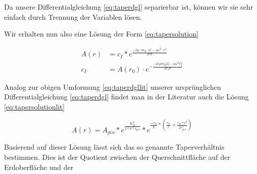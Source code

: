 \documentclass[a4paper, 10pt]{report}
\begin{document}

Da unsere Differentialgleichung \ref{eq:taperdgl} separierbar ist, können wir sie sehr einfach durch Trennung der Variablen lösen.


Wir erhalten nun also eine Lösung der Form \ref{eq:tapersolution}

\begin{align}
A(r) &= c_I * e^{\frac{-2\rho \cdot m_E \cdot G - \rho \omega^2 \cdot r^3}{2 r \sigma}}\label{eq:tapersolution}\\
c_I &= A(r_0) \cdot e^{-\frac{-2 c \rho m_E G - \rho \omega^2 r_0^3}{2 r_0 \sigma}}
\end{align}

Analog zur obigen Umformung \ref{eq:taperdgllit} unserer ursprünglichen Differentialgleichung \ref{eq:taperdgl} findet man in der Literatur auch die Lösung \ref{eq:tapersolutionlit}

\begin{equation}
A(r)=A_{geo}*e^\frac{3r_E^2}{2*h*r_{geo}}*e^{\frac{-r_E}{h}*(\frac{r_E}{r}+\frac{r_E*r^2}{2r_{geo}^3})}
\label{eq:tapersolutionlit}
\end{equation}

Basierend auf dieser Lösung lässt sich das so genannte Taperverhältnis bestimmen. Dies ist der Quotient zwischen der Querschnittfläche auf der Erdoberfläche und der 
\end{document}
